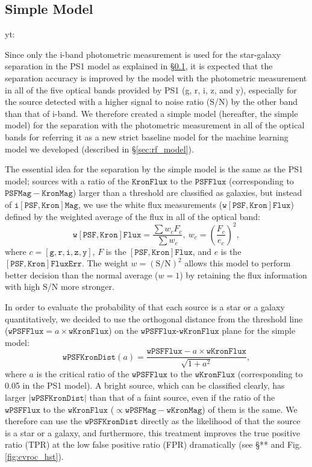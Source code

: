 \documentclass[twocolumn]{aastex62}
\newcommand{\yutaro}[1]{{\color{red} yt: {#1}}}
\begin{document}
\subsection{Simple Model}\label{sec:simple_model}
\yutaro{
Since only the i-band photometric measurement is used for the star-galaxy separation  
in the PS1 model as explained in \S\ref{sec:simple_model},  
it is expected that the separation accuracy is improved 
by the model with the photometric measurement in all of the five optical bands 
provided by PS1 (g, r, i, z, and y), especially for the source 
detected with a higher signal to noise ratio (S/N) by the other band than that of i-band. 
We therefore created a simple model (hereafter, the simple model) for the separation 
with the photometric measurement in all of the optical bands 
for referring it as a new strict baseline model for the machine learning model  
we developed (described in \S\ref{sec:rf_model}).

The essential idea for the separation by the simple model is the same as the PS1 model;  
sources with a ratio of the $\mathtt{KronFlux}$ to the $\mathtt{PSFFlux}$ 
(corresponding to $\mathtt{PSFMag} - \mathtt{KronMag}$) larger than a threshold 
are classified as galaxies, 
but instead of $\mathtt{i[PSF, Kron]Mag}$,  
we use the white flux measurements ($\mathtt{w[PSF,Kron]Flux}$) 
defined by the weighted average of the flux in all of the optical band:   
$$
\mathtt{w[PSF, Kron]Flux} =  \frac{\sum w_c  F_c }{\sum w_c}, 
\ w_c = \left( \frac{F_c}{e_c} \right)^2, 
$$
where $c = [\mathtt{g, r, i, z, y}]$,  $F$ is the $\mathtt{[PSF,Kron]Flux}$, 
and $e$ is the $\mathtt{[PSF,Kron]FluxErr}$.  
The weight $w = \mathrm{(S/N)}^2$ allows this model to perform better decision 
than the normal average ($w = 1$) by retaining the flux information with high S/N more stronger. 

In order to evaluate the probability of that each source is a star or a galaxy quantitatively, 
we decided to use the orthogonal distance from the threshold line 
($\mathtt{wPSFFlux} = a\times \mathtt{wKronFlux}$) 
on the $\mathtt{wPSFFlux}$-$\mathtt{wKronFlux}$ plane for the simple model:  
$$
\mathtt{wPSFKronDist}(a) = 
	\frac{\mathtt{wPSFFlux} - a\times\mathtt{wKronFlux}}{ \sqrt{1 + a^2}}, 
$$
where $a$ is the critical ratio of the $\mathtt{wPSFFlux}$ to the $\mathtt{wKronFlux}$ 
(corresponding to 0.05 in the PS1 model). 
A bright source, which can be classified clearly, 
has larger $|\mathtt{wPSFKronDist}|$ than that of a faint source, 
even if the ratio of the $\mathtt{wPSFFlux}$ to the $\mathtt{wKronFlux} $
($\propto \mathtt{wPSFMag}  -  \mathtt{wKronMag}$) of them is the same. 
We therefore can use the $\mathtt{wPSFKronDist}$ directly 
as the likelihood of that the source is a star or a galaxy, 
and furthermore, this treatment improves the true positive ratio (TPR) 
at the low false positive ratio (FPR) dramatically (see \S*** and Fig.\ref{fig:cvroc_hst}). 

}
\end{document}
